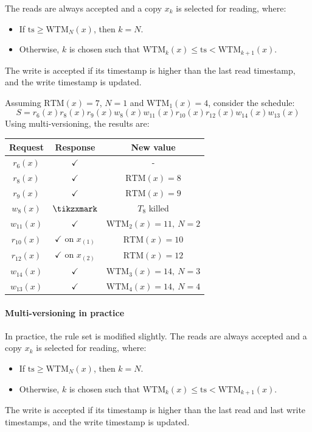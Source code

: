 The reads are always accepted and a copy $x_k$ is selected for reading, where:
\begin{itemize}
    \item If $\text{ts} \geq \text{WTM}_N(x)$, then $k=N$.
    \item Otherwise, $k$ is chosen such that $\text{WTM}_k(x) \leq \text{ts} < \text{WTM}_{k+1}(x)$. 
\end{itemize}
The write is accepted if its timestamp is higher than the last read timestamp, and the write timestamp is updated. 

\begin{example}
    Assuming  $\text{RTM}(x)=7$, $N=1$ and $\text{WTM}_1(x)=4$, consider the schedule:
    \[S=r_6(x) r_8(x) r_9(x) w_8(x) w_{11}(x) r_{10}(x) r_{12}(x) w_{14}(x) w_{13}(x)\]
    Using multi-versioning, the results are:
    \begin{table}[H]
        \centering
        \begin{tabular}{ccc}
        \textbf{Request} & \textbf{Response}         & \textbf{New value}  \\ \hline
        $r_6(x)$         & $\checkmark$              & -                   \\
        $r_8(x)$         & $\checkmark$              & $\text{RTM}(x)=8$          \\
        $r_9(x)$         & $\checkmark$              & $\text{RTM}(x)=9$          \\
        $w_8(x)$         & $\tikzxmark$              & $T_8$ killed        \\
        $w_{11}(x)$      & $\checkmark$              & $\text{WTM}_2(x)=11,\:N=2$ \\
        $r_{10}(x)$      & $\checkmark$ on $x_{(1)}$ & $\text{RTM}(x)=10$         \\
        $r_{12}(x)$      & $\checkmark$ on $x_{(2)}$ & $\text{RTM}(x)=12$         \\
        $w_{14}(x)$      & $\checkmark$              & $\text{WTM}_3(x)=14,\:N=3$ \\
        $w_{13}(x)$      & $\checkmark$              & $\text{WTM}_4(x)=14,\:N=4$
        \end{tabular}
    \end{table}
\end{example}

\paragraph*{Multi-versioning in practice}
In practice, the rule set is modified slightly.
The reads are always accepted and a copy $x_k$ is selected for reading, where:
\begin{itemize}
    \item If $\text{ts} \geq \text{WTM}_N(x)$, then $k=N$. 
    \item Otherwise, $k$ is chosen such that $\text{WTM}_k(x) \leq \text{ts} < \text{WTM}_{k+1}(x)$. 
\end{itemize}
The write is accepted if its timestamp is higher than the last read and last write timestamps, and the write timestamp is updated. 


